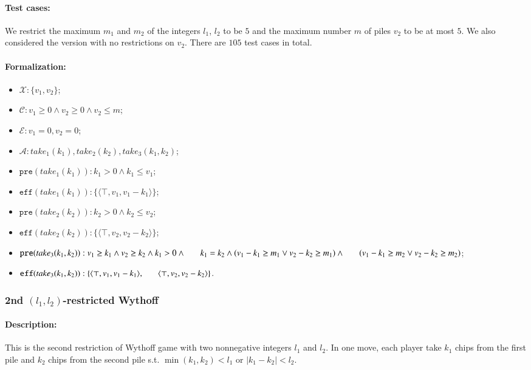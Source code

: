 \documentclass[review]{elsarticle}
\newcommand{\set}[1]{\{ #1 \}}
\newcommand{\tuple}[1]{\langle {#1} \rangle}
\newcommand{\true}{\top}
\newcommand{\statevar}{\mathcal{X}}
\newcommand{\act}{\mathcal{A}}
\newcommand{\constraint}{\mathcal{C}}
\newcommand{\estate}{\mathcal{E}}
\newcommand{\pre}{\mathtt{pre}}
\newcommand{\eff}{\mathtt{eff}}
\begin{document}
\paragraph{Test cases:}
We restrict the maximum $m_1$ and $m_2$ of the integers $l_1$, $l_2$ to be $5$ and the maximum number $m$ of piles $v_2$ to be at most $5$.
We also considered the version with no restrictions on $v_2$.
There are $105$ test cases in total.
\paragraph{Formalization:}
\begin{itemize}
	\item $\statevar: \set{v_1, v_2}$;
	\item $\constraint: v_1 \ge 0 \wedge  v_2 \ge 0 \wedge v_2 \le m$;
	\item $\estate: v_1 =0 , v_2 = 0$;
	\item $\act:take_1(k_1), take_2(k_2), take_3(k_1,k_2)$;
	\item $\pre(take_1(k_1)) :  k_1 > 0 \wedge k_1 \le v_1$;
	\item $\eff(take_1(k_1)) : \set{\tuple{\true, v_1, v_1-k_1}}$;
	\item $\pre(take_2(k_2)) :  k_2 > 0 \wedge k_2 \le v_2$;
	\item $\eff(take_2(k_2)) : \set{\tuple{\true, v_2, v_2-k_2}}$;
	\item $\pre(take_3(k_1, k_2)) : v_1 \ge k_1 \wedge v_2 \ge k_2 \wedge
	k_1 > 0 \wedge  \\ \hspace*{6mm} k_1 = k_2 \wedge (v_1 - k_1 \ge m_1 \vee v_2 - k_2 \ge m_1) \wedge \\ \hspace*{6mm}
	(v_1 - k_1 \ge m_2 \vee v_2 - k_2 \ge m_2)$;
	\item $\eff(take_3(k_1, k_2)) : \set{\tuple{\true, v_1, v_1 -k_1},\\ \hspace*{6mm}
		\tuple{\true, v_2, v_2 - k_2}}$.
\end{itemize}



\subsubsection{2nd $(l_1,l_2)$-restricted Wythoff \protect\cite{Gur2012}}

\paragraph{Description:}
This is the second restriction of Wythoff game with two nonnegative integers $l_1$ and $l_2$.
In one move, each player take $k_1$ chips from the first pile and $k_2$ chips from the second pile s.t. $\min(k_1, k_2) < l_1$ or $|k_1 - k_2| < l_2$.
%
\end{document}
